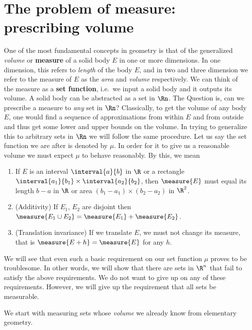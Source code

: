 \chapter{The problem of measure: prescribing volume}
One of the most fundamental concepts in geometry is that of the generalized \emph{volume} or \textbf{measure}
of a solid body $E$ in one or more dimensions. In one dimension, this refers to \emph{length} of the body $E$,
and in two and three dimension we refer to the measure of $E$ as the \emph{area} and \emph{volume}
respectively. We can think of the measure as a \textbf{set function}, i.e.~we input a solid body and it
outputs its volume. A solid body can be abstracted as a set in $\Rn$. The Question is, can we prescribe a
measure to \emph{any} set in $\Rn$?  Classically, to get the volume of any body $E$, one would find a sequence
of approximations from within $E$ and from outside and thus get some lower and upper bounds on the volume. In
trying to generalize this to arbitrary sets in $\Rn$ we will follow the same procedure. Let us say the set
function we are after is denoted by $\mu$. In order for it to give us a reasonable volume we must expect $\mu$
to behave reasonably. By this, we mean
\begin{enumerate}
    \item
	If $E$ is an interval $\interval{a}{b}$ in $\R$ or a rectangle $\interval{a_1}{b_1} \times
	\interval{a_2}{b_2}$, then $\measure{E}$ must equal its length $b-a$ in $\R$ or area
	$(b_1-a_1)\times(b_2-a_2)$ in $\R^2$.
    \item
	(Additivity) If $E_1$, $E_2$ are disjoint then $\measure{E_1\cup E_2} = \measure{E_1}+\measure{E_2}$.
    \item
	(Translation invariance) If we translate $E$, we must not change its measure, 
	that is $\measure{E+h} = \measure{E}$ for any $h$.
\end{enumerate}
We will see that even such a basic requirement on our set function $\mu$ proves to be troublesome. In other
words, we will show that there are sets in $\R^n$ that fail to satisfy the above requirements. We do not want to
give up on any of these requirements. However, we will give up the requirement that all sets be measurable.

We start with measuring sets whose \emph{volume} we already know from elementary geometry.
